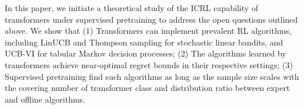 \documentclass[10pt]{article}
\newcommand{\<}{\left\langle}
\renewcommand{\>}{\right\rangle}
\newcommand{\authnote}[2]{{\scriptsize $\ll$\textsf{#1 notes: #2}$\gg$}}
\newcommand{\authnote}[2]{}
\newcommand{\yub}[1]{{\color{red}\authnote{Yu}{#1}}}
\newcommand{\lc}[1]{{\color{blue}\authnote{Licong}{#1}}}
\begin{document}





In this paper, we initiate a theoretical study of the ICRL capability of transformers under supervised pretraining to address the open questions outlined above. We show that (1) Transformers can implement prevalent RL algorithms, including LinUCB and Thompson sampling for stochastic linear bandits, and UCB-VI for tabular Markov decision processes; (2) The algorithms learned by transformers achieve near-optimal regret bounds in their respective settings; (3) Supervised pretraining find such algorithms as long as the sample size scales with the covering number of transformer class and distribution ratio between expert and offline algorithms. %
\end{document}
